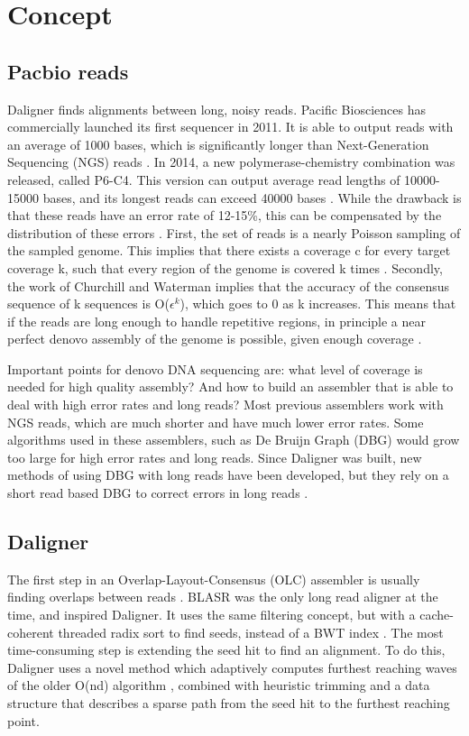 \documentclass[../main/thesis.tex]{subfiles}
\begin{document}
\chapter{Concept}
\ifdefined\main
\newcommand{\codePath}{../3_concept/code/}
\newcommand{\figPath}{../3_concept/figures/}
\else

\fi

\section{Pacbio reads}
Daligner finds alignments between long, noisy reads.
Pacific Biosciences has commercially launched its first sequencer in 2011.
It is able to output reads with an average of 1000 bases, which is significantly longer than Next-Generation Sequencing (NGS) reads \cite{PBlaunch1}.
In 2014, a new polymerase-chemistry combination was released, called P6-C4.
This version can output average read lengths of 10000-15000 bases, and its longest reads can exceed 40000 bases \cite{Longreads}.
While the drawback is that these reads have an error rate of 12-15\%, this can be compensated by the distribution of these errors \cite{Daligner}.
First, the set of reads is a nearly Poisson sampling of the sampled genome.
This implies that there exists a coverage c for every target coverage k, such that every region of the genome is covered k times \cite{Poisson}.
Secondly, the work of Churchill and Waterman \cite{quality} implies that the accuracy of the consensus sequence of k sequences is O($\epsilon^k$), which goes to 0 as k increases.
This means that if the reads are long enough to handle repetitive regions, in principle a near perfect denovo assembly of the genome is possible, given enough coverage \cite{Daligner}.

Important points for denovo DNA sequencing are: what level of coverage is needed for high quality assembly?
And how to build an assembler that is able to deal with high error rates and long reads?
Most previous assemblers work with NGS reads, which are much shorter and have much lower error rates.
Some algorithms used in these assemblers, such as De Bruijn Graph (DBG) \cite{DeBruijn} would grow too large for high error rates and long reads.
Since Daligner was built, new methods of using DBG with long reads have been developed, but they rely on a short read based DBG to correct errors in long reads \cite{DBG1}\cite{DBG2}.

\section{Daligner}
The first step in an Overlap-Layout-Consensus (OLC) assembler is usually finding overlaps between reads \cite{OLC}.
BLASR \cite{BLASR} was the only long read aligner at the time, and inspired Daligner.
It uses the same filtering concept, but with a cache-coherent threaded radix sort to find seeds, instead of a BWT index \cite{BWT}.
The most time-consuming step is extending the seed hit to find an alignment.
To do this, Daligner uses a novel method which adaptively computes furthest reaching waves of the older O(nd) algorithm \cite{O_ND}, combined with heuristic trimming and a data structure that describes a sparse path from the seed hit to the furthest reaching point.
\end{document}
